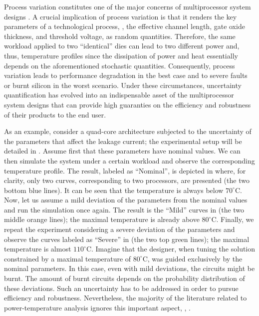 Process variation constitutes one of the major concerns of multiprocessor system designs \cite{chandrakasan2001, srivastava2010}.
A crucial implication of process variation is that it renders the key parameters of a technological process, \eg, the effective channel length, gate oxide thickness, and threshold voltage, as random quantities.
Therefore, the same workload applied to two ``identical'' dies can lead to two different power and, thus, temperature profiles since the dissipation of power and heat essentially depends on the aforementioned stochastic quantities.
Consequently, process variation leads to performance degradation in the best case and to severe faults or burnt silicon in the worst scenario.
Under these circumstances, uncertainty quantification \cite{xiu2010, maitre2010} has evolved into an indispensable asset of the multiprocessor system designs that can provide high guaranties on the efficiency and robustness of their products to the end user.

As an example, consider a quad-core architecture subjected to the uncertainty of the parameters that affect the leakage current; the experimental setup will be detailed in .
Assume first that these parameters have nominal values. We can then simulate the system under a certain workload and observe the corresponding temperature profile.
The result, labeled as ``Nominal'', is depicted in  where, for clarity, only two curves, corresponding to two processors, are presented (the two bottom blue lines). It can be seen that the temperature is always below $70^{\circ}$C. Now, let us assume a mild deviation of the parameters from the nominal values and run the simulation once again.
The result is the ``Mild'' curves in  (the two middle orange lines); the maximal temperature is already above $80^{\circ}$C.
Finally, we repeat the experiment considering a severe deviation of the parameters and observe the curves labeled as ``Severe'' in  (the two top green lines); the maximal temperature is almost $110^{\circ}$C.
Imagine that the designer, when tuning the solution constrained by a maximal temperature of $80^\circ$C, was guided exclusively by the nominal parameters. In this case, even with mild deviations, the circuits might be burnt.
The amount of burnt circuits depends on the probability distribution of these deviations.
Such an uncertainty has to be addressed in order to pursue efficiency and robustness.
Nevertheless, the majority of the literature related to power-temperature analysis ignores this important aspect, \eg, \cite{rao2009, rai2011, thiele2011, ukhov2012}.



